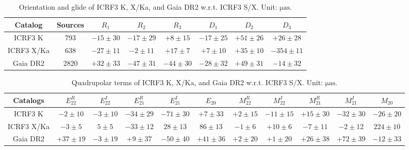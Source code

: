\documentclass{aa}   %
\begin{document}
\begin{table}[htbp]
	\center
    \caption{\label{table:vsh01}
        Orientation and glide of ICRF3 K, X/Ka, and Gaia DR2 w.r.t. ICRF3 S/X. 
        Unit: $\mathrm{\mu as}$.}
    \begin{tabular}{cccccccc}
        \hline \hline
        Catalog  &Sources & $R_1$ & $R_2$ & $R_3$ & $D_1$ & $D_2$ & $D_3$ \\[0.1cm]
        \hline 
        ICRF3 K    & 793 &$ -15\pm  30$  &$-17 \pm  29$ &$+ 8 \pm  15$ &$-17 \pm  25$ &$+51 \pm  26$ &$+26 \pm  28$ \\
        ICRF3 X/Ka & 638 &$ -27\pm  11$  &$- 2 \pm  11$ &$+17 \pm   7$ &$+ 7 \pm  10$ &$+35 \pm  10$ &$-354\pm  11$ \\
        Gaia DR2   &2820 &$ +32 \pm 33$  &$-47 \pm  31$ &$-44 \pm  30$ &$-28 \pm  32$ &$+49 \pm  31$ &$-14 \pm  32$ \\
        \hline
    \end{tabular}
\end{table}

\begin{table}[htbp]
	\center
    \caption{\label{table:vsh02}
        Quadrupolar terms of ICRF3 K, X/Ka, and Gaia DR2 w.r.t. ICRF3 S/X. 
        Unit: $\mathrm{\mu as}$.}
    \begin{tabular}{ccccccccccc}
        \hline \hline
Catalogs    &$E_{22}^R$  &$E_{22}^I$  &$E_{21}^R$  &$E_{21}^I$  &$E_{20}$    &$M_{22}^R$  &$M_{22}^I$  &$M_{21}^R$  &$M_{21}^I$  &$M_{20}$    \\ [0.1cm]
\hline
ICRF3 K     &$   -2 \pm    10 $  &$   -3 \pm    10 $  &$  -34 \pm    29 $  &$  -71 \pm    30 $  &$   +7 \pm    33 $  &$   +2 \pm    15 $  &$  -11 \pm    15 $  &$  +15 \pm    30 $  &$  -32 \pm    30 $  &$  -26 \pm    20 $ \\
ICRF3 X/Ka  &$   -3 \pm     5 $  &$    5 \pm     5 $  &$  -33 \pm    12 $  &$   28 \pm    13 $  &$   86 \pm    13 $  &$   -1 \pm     6 $  &$  +10 \pm     6 $  &$   -7 \pm    11 $  &$   -2 \pm    12 $  &$  224 \pm    10 $ \\
Gaia DR2    &$  +37 \pm    19 $  &$   -3 \pm    19 $  &$  +9 \pm    37 $   &$  -50 \pm    40 $  &$  +41 \pm    36 $  &$   +2 \pm    20 $  &$   +1 \pm    20 $  &$  +26 \pm    38 $  &$  +72 \pm    39 $  &$  -12 \pm    33 $ \\
        \hline\end{tabular}
\end{table}
\end{document}
